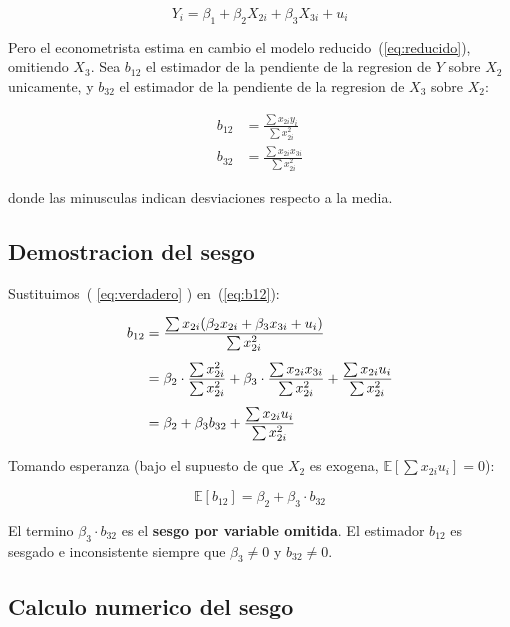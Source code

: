 \documentclass[12pt, letterpaper]{article}
\theoremstyle{remark}
\newcommand{\E}{\mathbb{E}}
\begin{document}
\begin{equation}
  Y_i = \beta_1 + \beta_2 X_{2i} + \beta_3 X_{3i} + u_i
  \label{eq:verdadero}
\end{equation}

\noindent Pero el econometrista estima en cambio el modelo reducido~(\ref{eq:reducido}),
omitiendo $X_3$. Sea $b_{12}$ el estimador de la pendiente de la regresion de $Y$
sobre $X_2$ unicamente, y $b_{32}$ el estimador de la pendiente de la regresion de
$X_3$ sobre $X_2$:

\begin{align}
  b_{12} &= \frac{\sum x_{2i} y_i}{\sum x_{2i}^2}
  \label{eq:b12}\\[4pt]
  b_{32} &= \frac{\sum x_{2i} x_{3i}}{\sum x_{2i}^2}
  \label{eq:b32}
\end{align}

\noindent donde las minusculas indican desviaciones respecto a la media.

\subsection{Demostracion del sesgo}

Sustituimos~( \ref{eq:verdadero} ) en~(\ref{eq:b12}):

\begin{align}
  b_{12}
  &= \frac{\sum x_{2i}(\beta_2 x_{2i} + \beta_3 x_{3i} + u_i)}{\sum x_{2i}^2}
  \notag\\[4pt]
  &= \beta_2 \cdot \frac{\sum x_{2i}^2}{\sum x_{2i}^2}
   + \beta_3 \cdot \frac{\sum x_{2i} x_{3i}}{\sum x_{2i}^2}
   + \frac{\sum x_{2i} u_i}{\sum x_{2i}^2}
  \notag\\[4pt]
  &= \beta_2 + \beta_3 b_{32} + \frac{\sum x_{2i} u_i}{\sum x_{2i}^2}
  \label{eq:sesgo_derivacion}
\end{align}

Tomando esperanza (bajo el supuesto de que $X_2$ es exogena, $\E[\sum x_{2i} u_i] = 0$):

\begin{equation}
  \boxed{
    \E[b_{12}] = \beta_2 + \beta_3 \cdot b_{32}
  }
  \label{eq:sesgo}
\end{equation}

\noindent El termino $\beta_3 \cdot b_{32}$ es el \textbf{sesgo por variable omitida}.
El estimador $b_{12}$ es sesgado e inconsistente siempre que $\beta_3 \neq 0$
y $b_{32} \neq 0$.

\subsection{Calculo numerico del sesgo}
\end{document}

